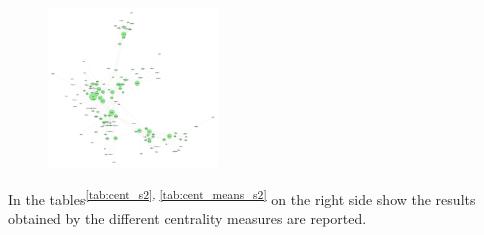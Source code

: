 \documentclass[10pt,twocolumn,letterpaper]{article}
\begin{document}
\newpage

\begin{figure}[!h]
    \centering
    \includegraphics[width=0.4\textwidth]{img/s3/pagerank_network.jpg}
\end{figure}

In the tables\textsuperscript{\ref{tab:cent_s2}, \ref{tab:cent_means_s2}} on the right side show the results obtained by the different centrality measures are reported.
\end{document}
